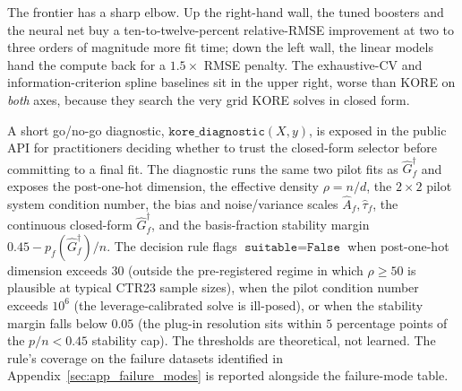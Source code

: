 \documentclass{article}
\newcommand{\KORE}{\textsc{KORE}}
\begin{document}
The frontier has a sharp elbow. Up the right-hand wall, the tuned boosters and the neural net buy a ten-to-twelve-percent relative-RMSE improvement at two to three orders of magnitude more fit time; down the left wall, the linear models hand the compute back for a $1.5\times$ RMSE penalty. The exhaustive-CV and information-criterion spline baselines sit in the upper right, worse than \KORE{} on \emph{both} axes, because they search the very grid \KORE{} solves in closed form.

A short go/no-go diagnostic, $\texttt{kore\_diagnostic}(X, y)$, is exposed in the public API for practitioners deciding whether to trust the closed-form selector before committing to a final fit. The diagnostic runs the same two pilot fits as $\widehat G_f^\dagger$ and exposes the post-one-hot dimension, the effective density $\rho = n / d$, the $2 \times 2$ pilot system condition number, the bias and noise/variance scales $\widehat A_f, \widehat \tau_f$, the continuous closed-form $\widehat G_f^\dagger$, and the basis-fraction stability margin $0.45 - p_f(\widehat G_f^\dagger)/n$. The decision rule flags $\texttt{suitable} = \texttt{False}$ when post-one-hot dimension exceeds $30$ (outside the pre-registered regime in which $\rho \ge 50$ is plausible at typical CTR23 sample sizes), when the pilot condition number exceeds $10^6$ (the leverage-calibrated solve is ill-posed), or when the stability margin falls below $0.05$ (the plug-in resolution sits within $5$ percentage points of the $p / n < 0.45$ stability cap). The thresholds are theoretical, not learned. The rule's coverage on the failure datasets identified in Appendix~\ref{sec:app_failure_modes} is reported alongside the failure-mode table.
\end{document}

